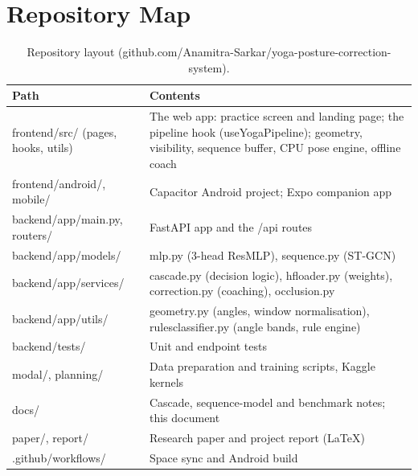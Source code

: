 \documentclass[11pt,a4paper]{article}
\newcommand{\ubrk}{\textunderscore\allowbreak}
\DeclareRobustCommand{\code}[1]{{\ttfamily\small\let\_\ubrk #1}}
\begin{document}
\section{Repository Map}
\begin{table}[H]
\centering\small
\caption{Repository layout (\code{github.com/Anamitra-Sarkar/yoga-posture-correction-system}).}\label{tab:repo}
\begin{tabularx}{\textwidth}{@{}L{5.6cm}Y@{}}
\toprule
Path & Contents \\ \midrule
\code{frontend/src/} (\code{pages}, \code{hooks}, \code{utils}) & The web app: practice screen and landing page; the pipeline hook (\code{useYogaPipeline}); geometry, visibility, sequence buffer, CPU pose engine, offline coach \\
\code{frontend/android/}, \code{mobile/} & Capacitor Android project; Expo companion app \\
\code{backend/app/main.py}, \code{routers/} & FastAPI app and the \code{/api} routes \\
\code{backend/app/models/} & \code{mlp.py} (3-head ResMLP), \code{sequence.py} (ST-GCN) \\
\code{backend/app/services/} & \code{cascade.py} (decision logic), \code{hf\_loader.py} (weights), \code{correction.py} (coaching), \code{occlusion.py} \\
\code{backend/app/utils/} & \code{geometry.py} (angles, window normalisation), \code{rules\_classifier.py} (angle bands, rule engine) \\
\code{backend/tests/} & Unit and endpoint tests \\
\code{modal/}, \code{planning/} & Data preparation and training scripts, Kaggle kernels \\
\code{docs/} & Cascade, sequence-model and benchmark notes; this document \\
\code{paper/}, \code{report/} & Research paper and project report (LaTeX) \\
\code{.github/workflows/} & Space sync and Android build \\ \bottomrule
\end{tabularx}
\end{table}
\end{document}
